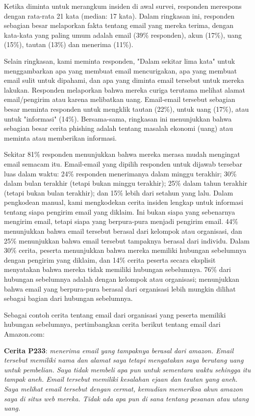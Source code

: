 \documentclass[lettersize,journal]{IEEEtran}
\begin{document}
Ketika diminta untuk merangkum insiden di awal survei, responden merespons dengan rata-rata 21 kata (median: 17 kata). Dalam ringkasan ini, responden sebagian besar melaporkan fakta tentang email yang mereka terima, dengan kata-kata yang paling umum adalah email (39\% responden), akun (17\%), uang (15\%), tautan (13\%) dan menerima (11\%).

Selain ringkasan, kami meminta responden, "Dalam sekitar lima kata" untuk menggambarkan apa yang membuat email mencurigakan, apa yang membuat email sulit untuk dipahami, dan apa yang diminta email tersebut untuk mereka lakukan. Responden melaporkan bahwa mereka curiga terutama melihat alamat email/pengirim atau karena melibatkan uang. Email-email tersebut sebagian besar meminta responden untuk mengklik tautan (22\%), untuk uang (17\%), atau untuk "informasi" (14\%). Bersama-sama, ringkasan ini menunjukkan bahwa sebagian besar cerita phishing adalah tentang masalah ekonomi (uang) atau meminta atau memberikan informasi.

Sekitar 81\% responden menunjukkan bahwa mereka merasa mudah mengingat email semacam itu. Email-email yang dipilih responden untuk dijawab tersebar luas dalam waktu: 24\% responden menerimanya dalam minggu terakhir; 30\% dalam bulan terakhir (tetapi bukan minggu terakhir); 25\% dalam tahun terakhir (tetapi bukan bulan terakhir); dan 15\% lebih dari setahun yang lalu. Dalam pengkodean manual, kami mengkodekan cerita insiden lengkap untuk informasi tentang siapa pengirim email yang diklaim. Ini bukan siapa yang sebenarnya mengirim email, tetapi siapa yang berpura-pura menjadi pengirim email. 44\% menunjukkan bahwa email tersebut berasal dari kelompok atau organisasi, dan 25\% menunjukkan bahwa email tersebut tampaknya berasal dari individu. Dalam 30\% cerita, peserta menunjukkan bahwa mereka memiliki hubungan sebelumnya dengan pengirim yang diklaim, dan 14\% cerita peserta secara eksplisit menyatakan bahwa mereka tidak memiliki hubungan sebelumnya. 76\% dari hubungan sebelumnya adalah dengan kelompok atau organisasi; menunjukkan bahwa email yang berpura-pura berasal dari organisasi lebih mungkin dilihat sebagai bagian dari hubungan sebelumnya.

Sebagai contoh cerita tentang email dari organisasi yang peserta memiliki hubungan sebelumnya, pertimbangkan cerita berikut tentang email dari Amazon.com:

\textbf{Cerita P233}: \textit{menerima email yang tampaknya berasal dari amazon. Email tersebut memiliki nama dan alamat saya tetapi mengatakan saya berutang uang untuk pembelian. Saya tidak membeli apa pun untuk sementara waktu sehingga itu tampak aneh. Email tersebut memiliki kesalahan ejaan dan tautan yang aneh. Saya melihat email tersebut dengan cermat, kemudian memeriksa akun amazon saya di situs web mereka. Tidak ada apa pun di sana tentang pesanan atau utang uang.}
\end{document}
